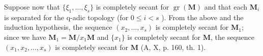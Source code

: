 Suppose now that \(\{\xi_1, \ldots, \xi_s\}\) is completely secant for \(\operatorname{gr}(\mathbf{M})\) and that each \(\mathbf{M}_i\) is separated for the q-adic topology (for \(0 \leqslant i < s\) ). From the above and the induction hypothesis, the sequence \((x_2, \ldots, x_s)\) is completely secant for \(\mathbf{M}_1\); since we have \(\mathbf{M}_1 = \mathbf{M}/x_1\mathbf{M}\) and \(\{x_1\}\) is completely secant for \(\mathbf{M}\), the sequence \((x_1, x_2, \ldots, x_s)\) is completely secant for \(\mathbf{M}\) (A, X, p. 160, th. 1).

